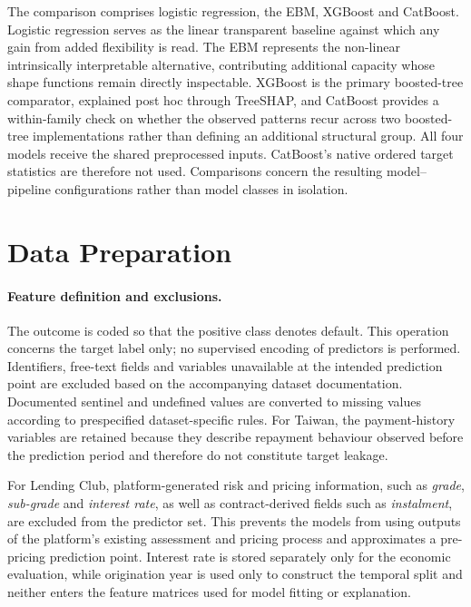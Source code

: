 The comparison comprises logistic regression, the EBM, XGBoost and CatBoost. Logistic regression
serves as the linear transparent baseline against which any gain from added flexibility
is read. The EBM represents the non-linear intrinsically interpretable alternative,
contributing additional capacity whose shape functions remain directly inspectable.
XGBoost is the primary boosted-tree comparator, explained post hoc through TreeSHAP, and
CatBoost provides a within-family check on whether the observed patterns recur across two
boosted-tree implementations rather than defining an additional structural group. All
four models receive the shared preprocessed inputs. CatBoost's native ordered
target statistics are therefore not used. Comparisons concern the resulting
model--pipeline configurations rather than model classes in isolation.


\section{Data Preparation}\label{sec:prep}

\paragraph{Feature definition and exclusions.}
The outcome is coded so that the positive class denotes default. This operation
concerns the target label only; no supervised encoding of predictors is performed.
Identifiers, free-text fields and variables unavailable at the intended prediction
point are excluded based on the accompanying dataset documentation. Documented
sentinel and undefined values are converted to missing values according to
prespecified dataset-specific rules. For Taiwan, the payment-history variables are
retained because they describe repayment behaviour observed before the prediction
period and therefore do not constitute target leakage.

For Lending Club, platform-generated risk and pricing information, such as
\emph{grade}, \emph{sub-grade} and \emph{interest rate}, as well as
contract-derived fields such as \emph{instalment}, are excluded from the predictor
set. This prevents the models from using outputs of the platform's existing
assessment and pricing process and approximates a pre-pricing prediction point. Interest rate is stored separately only for the economic evaluation,
while origination year is used only to construct the temporal split and neither enters
the feature matrices used for model fitting or explanation.


